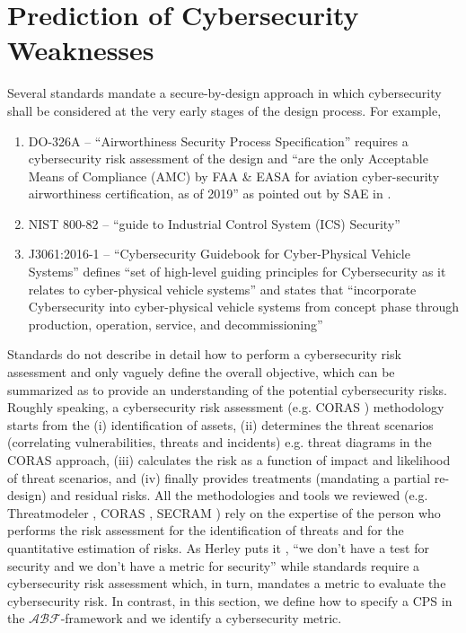 \documentclass[conference]{IEEEtran}
\newcommand{\assertionRegion}{\mathcal{A}}
\newcommand{\beliefRegion}{\mathcal{B}}
\newcommand{\factRegion}{\mathcal{F}}
\newcommand{\abftheory}{\assertionRegion\beliefRegion\factRegion}
\begin{document}
\section{Prediction of Cybersecurity Weaknesses}\label{sec:theory}
Several standards mandate a secure-by-design approach in which cybersecurity
shall be considered at the very early stages of the design process.  For
example,
\begin{enumerate}[noitemsep]
	\item DO-326A -- ``Airworthiness Security Process Specification''
		requires a cybersecurity risk assessment of the design and
		``are the only Acceptable Means of Compliance (AMC) by FAA
		\& EASA for aviation cyber-security airworthiness certification,
		as of 2019'' as pointed out by SAE in \autocite{SAE2019DO326A}.
	\item NIST 800-82 \autocite{Stouffer2011guide} -- ``guide to Industrial
		Control System (ICS) Security''
	\item J3061:2016-1 \autocite{SAE2016J3061} -- ``Cybersecurity Guidebook
		for Cyber-Physical Vehicle Systems'' defines ``set of
		high-level guiding principles for Cybersecurity as it relates
		to cyber-physical vehicle systems'' and states that
		``incorporate Cybersecurity into cyber-physical vehicle systems
		from concept phase through production, operation, service, and
		decommissioning''
\end{enumerate}
Standards do not describe in detail how to perform a cybersecurity risk 
assessment and only vaguely define the overall objective, which
can be summarized as to provide an understanding of the potential cybersecurity risks.
Roughly speaking, a cybersecurity risk assessment (e.g. CORAS \autocite{Lund2010model}) 
methodology starts from the (i) identification of assets, (ii) determines
the threat scenarios (correlating vulnerabilities, threats and incidents) e.g. 
threat diagrams in the CORAS
approach, (iii) calculates the risk as a function
of impact and likelihood of threat scenarios, and (iv) finally provides
treatments (mandating a partial re-design) and residual risks.
All the methodologies and tools we reviewed (e.g. Threatmodeler \autocite{Threatmodeler},
CORAS \autocite{Lund2010model}, SECRAM \autocite{De2015role})
rely on the expertise of the person who performs the risk assessment for
the identification of threats and for the quantitative estimation of risks.
As Herley puts it \autocite{Herley2016usenixvideo}, ``we don't have a test for security and
we don't have a metric for security'' while standards require a cybersecurity risk assessment
which, in turn, mandates a metric to evaluate the cybersecurity risk. 
In contrast, in this section, we define how to specify a CPS in the $\abftheory$-framework
and we identify a cybersecurity metric.
\end{document}

